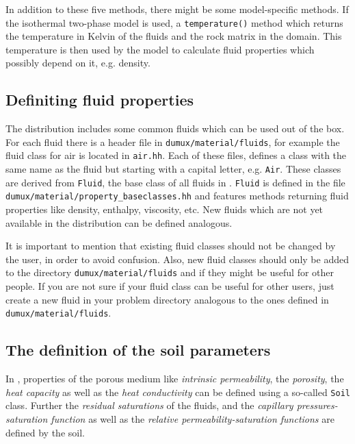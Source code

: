 In addition to these five methods, there might be some model-specific
methods. If the isothermal two-phase model is used, a
\texttt{temperature()} method which returns the temperature in Kelvin
of the fluids and the rock matrix in the domain. This temperature is
then used by the model to calculate fluid properties which possibly
depend on it, e.g. density.


\subsection{Definiting fluid properties}\label{tutorial-coupled:description-fluid-class}

The \Dumux distribution includes some common fluids which can be used
out of the box. For each fluid there is a header file in
\texttt{dumux/material/fluids}, for example the fluid class for air is
located in \texttt{air.hh}. Each of these files, defines a class with
the same name as the fluid but starting with a capital letter,
e.g. \texttt{Air}. These classes are derived from \texttt{Fluid}, the
base class of all fluids in \Dumux. \texttt{Fluid} is defined in the
file \texttt{dumux/material/property\_baseclasses.hh} and features
methods returning fluid properties like density, enthalpy, viscosity,
etc. New fluids which are not yet available in the \Dumux distribution
can be defined analogous.

It is important to mention that existing fluid classes should not be
changed by the user, in order to avoid confusion. Also, new fluid
classes should only be added to the directory
\texttt{dumux/material/fluids} and if they might be useful for other
people. If you are not sure if your fluid class can be useful for
other \Dumux users, just create a new fluid in your problem directory
analogous to the ones defined in \texttt{dumux/material/fluids}.

\subsection{The definition of the soil parameters}\label{tutorial-coupled:description-soil-class}

In \Dumux, properties of the porous medium like \textit{intrinsic
  permeability}, the \textit{porosity}, the \textit{heat capacity} as
well as the \textit{heat conductivity} can be defined using a
so-called \texttt{Soil} class. Further the \textit{residual
  saturations} of the fluids, and the \textit{capillary
  pressures-saturation function} as well as the \textit{relative
  permeability-saturation functions} are defined by the soil.


